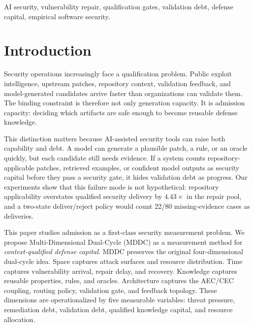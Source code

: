 ﻿\documentclass[lettersize,journal]{IEEEtran}
\begin{document}
\begin{abstract}
The boundary is also explicit. A patch-differential oracle cross-check validates 55/99 strict ASR admissions, with Wilson 95\% CI 0.457--0.650, and has a 15.1\% cross-category false-validation rate, so it is reported as boundary evidence rather than behavioral proof. The frozen 30-task all-gate repair run yields 1/30 primary security-qualified delivery and 0/30 original deployment-qualified deliveries; one same-candidate recovered-native all-gate case is reported separately as post-hoc existence evidence. The KEV activation analysis yields calibrated frontiers of 0.275 and 0.325, reproduced from saved replay curves, showing when CEC activation should fall back to AEC-only. MDDC therefore claims a reproducible measurement and admission-control method for AI defense capital, not automatic AI repair or deployment-level superiority.
\end{abstract}

\begin{IEEEkeywords}
AI security, vulnerability repair, qualification gates, validation debt, defense capital, empirical software security.
\end{IEEEkeywords}

\section{Introduction}
Security operations increasingly face a qualification problem. Public exploit intelligence, upstream patches, repository context, validation feedback, and model-generated candidates arrive faster than organizations can validate them. The binding constraint is therefore not only generation capacity. It is admission capacity: deciding which artifacts are safe enough to become reusable defense knowledge.

This distinction matters because AI-assisted security tools can raise both capability and debt. A model can generate a plausible patch, a rule, or an oracle quickly, but each candidate still needs evidence. If a system counts repository-applicable patches, retrieved examples, or confident model outputs as security capital before they pass a security gate, it hides validation debt as progress. Our experiments show that this failure mode is not hypothetical: repository applicability overstates qualified security delivery by $4.43\times$ in the repair pool, and a two-state deliver/reject policy would count 22/80 missing-evidence cases as deliveries.

This paper studies admission as a first-class security measurement problem. We propose Multi-Dimensional Dual-Cycle (MDDC) as a measurement method for \emph{context-qualified defense capital}. MDDC preserves the original four-dimensional dual-cycle idea. Space captures attack surfaces and resource distribution. Time captures vulnerability arrival, repair delay, and recovery. Knowledge captures reusable properties, rules, and oracles. Architecture captures the AEC/CEC coupling, routing policy, validation gate, and feedback topology. These dimensions are operationalized by five measurable variables: threat pressure, remediation debt, validation debt, qualified knowledge capital, and resource allocation.
\end{document}

